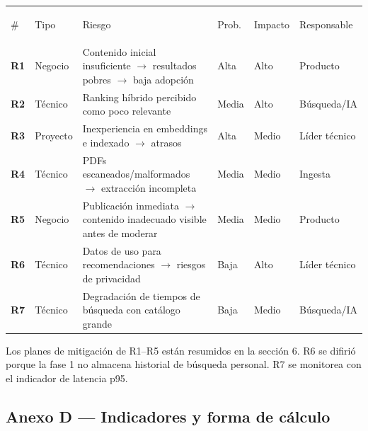 \documentclass[12pt,a4paper]{article}
\renewcommand{\arraystretch}{1.35}
\newcommand{\thead}[1]{{\color{white}\bfseries\rule[-0.9ex]{0pt}{3.2ex}#1}}
\newcommand{\bodystrut}{\rule[-0.7ex]{0pt}{2.7ex}}
\begin{document}
\medskip
\noindent\begingroup
\setlength{\tabcolsep}{6pt}
\renewcommand{\arraystretch}{1.5}
\begin{tabularx}{\linewidth}{>{\centering\arraybackslash\bfseries}p{0.6cm} >{\RaggedRight\arraybackslash}p{1.85cm} L >{\Centering\arraybackslash}p{1.2cm} >{\Centering\arraybackslash}p{1.75cm} >{\RaggedRight\arraybackslash}p{2.6cm}}
\thead{\#} & \thead{Tipo} & \thead{Riesgo} & \thead{Prob.} & \thead{Impacto} & \thead{Responsable} \\
R1 & Negocio & \bodystrut Contenido inicial insuficiente $\rightarrow$ resultados pobres $\rightarrow$ baja adopción & Alta & Alto & Producto \\
R2 & Técnico & \bodystrut Ranking híbrido percibido como poco relevante & Media & Alto & Búsqueda/IA \\
R3 & Proyecto & \bodystrut Inexperiencia en embeddings e indexado $\rightarrow$ atrasos & Alta & Medio & Líder técnico \\
R4 & Técnico & \bodystrut PDFs escaneados/malformados $\rightarrow$ extracción incompleta & Media & Medio & Ingesta \\
R5 & Negocio & \bodystrut Publicación inmediata $\rightarrow$ contenido inadecuado visible antes de moderar & Media & Medio & Producto \\
R6 & Técnico & \bodystrut Datos de uso para recomendaciones $\rightarrow$ riesgos de privacidad & Baja & Alto & Líder técnico \\
R7 & Técnico & \bodystrut Degradación de tiempos de búsqueda con catálogo grande & Baja & Medio & Búsqueda/IA \\
\bottomrule[\heavyrulewidth]
\end{tabularx}\endgroup

\medskip
Los planes de mitigación de R1–R5 están resumidos en la sección 6. R6 se difirió porque la fase 1 no almacena historial de búsqueda personal. R7 se monitorea con el indicador de latencia p95.

\subsection*{Anexo D — Indicadores y forma de cálculo}
\end{document}

